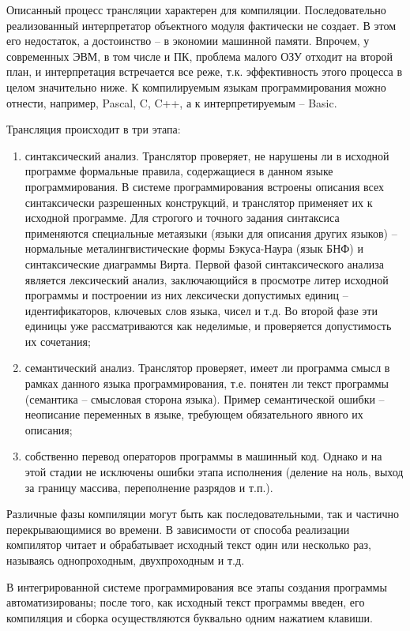 Описанный процесс трансляции характерен для компиляции. Последовательно реализованный интерпретатор объектного модуля фактически не создает. В этом его недостаток, а достоинство – в экономии машинной памяти. Впрочем, у современных ЭВМ, в том числе и ПК, проблема малого ОЗУ отходит на второй план, и интерпретация встречается все реже, т.к. эффективность этого процесса в целом значительно ниже. К компилируемым языкам программирования можно отнести, например, Pascal, C, C++, а к интерпретируемым – Basic.

\begin{utv}
  Трансляция происходит в три этапа:
  \begin{enumerate}
    \item синтаксический анализ. Транслятор проверяет, не нарушены ли в исходной программе формальные правила, содержащиеся в данном языке программирования. В системе программирования встроены описания всех синтаксически разрешенных конструкций, и транслятор применяет их к исходной программе. Для строгого и точного задания синтаксиса применяются специальные метаязыки (языки для описания других языков) – нормальные металингвистические формы Бэкуса-Наура (язык БНФ) и синтаксические диаграммы Вирта. Первой фазой синтаксического анализа является лексический анализ, заключающийся в просмотре литер исходной программы и построении из них лексически допустимых единиц – идентификаторов, ключевых слов языка, чисел и т.д. Во второй фазе эти единицы уже рассматриваются как неделимые, и проверяется допустимость их сочетания;
    \item семантический анализ. Транслятор проверяет, имеет ли программа смысл в рамках данного языка программирования, т.е. понятен ли текст программы (семантика – смысловая сторона языка). Пример семантической ошибки – неописание переменных в языке, требующем обязательного явного их описания;
    \item собственно перевод операторов программы в машинный код. Однако и на этой стадии не исключены ошибки этапа исполнения (деление на ноль, выход за границу массива, переполнение разрядов и т.п.).
  \end{enumerate}
\end{utv}

Различные фазы компиляции могут быть как последовательными, так и частично перекрывающимися во времени. В зависимости от способа реализации компилятор читает и обрабатывает исходный текст один или несколько раз, называясь однопроходным, двухпроходным и т.д.

В интегрированной системе программирования все этапы создания программы автоматизированы; после того, как исходный текст программы введен, его компиляция и сборка осуществляются буквально одним нажатием клавиши.

